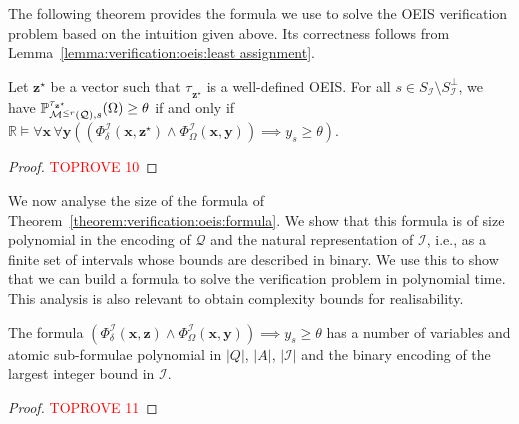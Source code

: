 \documentclass[a4paper,UKenglish,cleveref,autoref,thm-restate,colorlinks]{lipics-v2021}
\newcommand{\IR}{\mathbb{R}}
\newcommand{\mdp}{\mathcal{M}}
\newcommand{\mdpStateSpace}{S}
\newcommand{\ocmdp}{\mathcal{Q}}
\newcommand{\ocmdpFin}[2]{\mdp^{\leq #2}(#1)}
\newcommand{\ocStateSpace}{Q}
\newcommand{\ocConfig}{s}
\newcommand{\ocActionSpace}{A}
\newcommand{\ocTrans}{\delta}
\newcommand{\counterUB}{r}
\newcommand{\intPart}{\mathcal{I}}
\newcommand{\compressChainStateSpace}{\mdpStateSpace_{\intPart}}
\newcommand{\compressChainStateSpaceStar}{\mdpStateSpace_{\intPart}^{\bot}}
\newcommand{\varTrans}{x}
\newcommand{\varTransTuple}{\mathbf{\varTrans}}
\newcommand{\varObj}{y}
\newcommand{\varObjTuple}{\mathbf{\varObj}}
\newcommand{\varStrat}{z}
\newcommand{\varStratTuple}{\mathbf{\varStrat}}
\newcommand{\solStratTuple}{\mathbf{\varStrat}^{\star}}
\newcommand{\formulaTransBase}{\Phi_{\ocTrans}}
\newcommand{\formulaObjBase}{\Phi_{\objective}}
\newcommand{\formulaTrans}{\formulaTransBase^\intPart}
\newcommand{\formulaObj}{\formulaObjBase^\intPart}
\newcommand{\objective}{\Omega}
\newcommand{\thresProba}{\theta}
\newcommand{\stratBGeneric}[1]{{\tau_{#1}}}
\newcommand{\stratB}{\stratBGeneric{}}
\begin{document}
The following theorem provides the formula we use to solve the OEIS verification problem based on the intuition given above.
Its correctness follows from Lemma~\ref{lemma:verification:oeis:least assignment}.
\begin{theorem}\label{theorem:verification:oeis:formula}
  Let $\solStratTuple$ be a vector such that $\stratB_{\solStratTuple}$ is a well-defined OEIS.
  For all $\ocConfig\in\compressChainStateSpace\setminus\compressChainStateSpaceStar$, we have $\probaGverb{\ocmdpFin{\ocmdp}{\counterUB}}{\ocConfig}{\stratB_{\solStratTuple}}(\objective) \geq\thresProba$ if and only if $\IR\models\forall\varTransTuple\,\forall\varObjTuple ((\formulaTrans(\varTransTuple,\solStratTuple)\land\formulaObj(\varTransTuple, \varObjTuple))\implies \varObj_\ocConfig\geq\thresProba)$.
\end{theorem}
\begin{proof}\textcolor{red}{TOPROVE 10}\end{proof}

We now analyse the size of the formula of Theorem~\ref{theorem:verification:oeis:formula}.
We show that this formula is of size polynomial in the encoding of $\ocmdp$ and the natural representation of $\intPart$, i.e., as a finite set of intervals whose bounds are described in binary.
We use this to show that we can build a formula to solve the verification problem in polynomial time.
This analysis is also relevant to obtain complexity bounds for realisability.
\begin{lemma}\label{lemma:verification:oeis:formula:size}
  The formula $(\formulaTrans(\varTransTuple,\varStratTuple)\land\formulaObj(\varTransTuple, \varObjTuple))\implies \varObj_\ocConfig\geq\thresProba$ has a number of variables and atomic sub-formulae polynomial in $|\ocStateSpace|$, $|\ocActionSpace|$, $|\intPart|$ and the binary encoding of the largest integer bound in $\intPart$.
\end{lemma}
\begin{proof}\textcolor{red}{TOPROVE 11}\end{proof}
\end{document}
